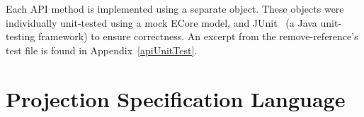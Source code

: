 \documentclass{article}
\begin{document}
{Each API method is implemented using a separate object. These objects were individually unit-tested using a mock ECore model, and JUnit~\cite{junit} (a Java unit-testing framework) to ensure correctness. An excerpt from the remove-reference's test file is found in Appendix~\ref{apiUnitTest}.
\newpage
\section{Projection Specification Language}\label{EditorLanguage}
}
\end{document}

